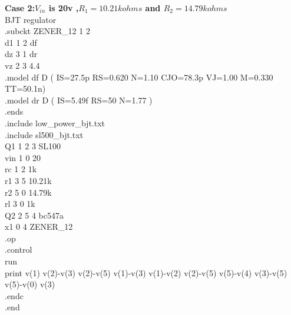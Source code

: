 \documentclass[12pt]{article}
\begin{document}
\textbf{Case 2:\(V_{in}\) is 20v ,\(R_{1}=10.21 k ohms\) and \(R_{2}=14.79 k ohms\)\\}
BJT regulator\\
.subckt ZENER\_12 1 2\\
d1 1 2 df\\
dz 3 1 dr\\
vz 2 3 4.4\\
.model df D ( IS=27.5p RS=0.620 N=1.10 CJO=78.3p VJ=1.00 M=0.330 TT=50.1n)\\
.model dr D ( IS=5.49f RS=50 N=1.77 )\\
.ends\\
.include low\_power\_bjt.txt\\
.include sl500\_bjt.txt\\
Q1 1 2 3 SL100	\\
vin 1 0 20\\
rc 1 2 1k\\
r1 3 5 10.21k\\
r2 5 0 14.79k\\
rl 3 0 1k\\
Q2 2 5 4 bc547a\\
x1 0 4 ZENER\_12\\
.op \\
.control\\
run\\
print v(1) v(2)-v(3) v(2)-v(5) v(1)-v(3) v(1)-v(2) v(2)-v(5) v(5)-v(4) v(3)-v(5) v(5)-v(0) v(3)\\
.endc \\
.end\\
\end{document}
